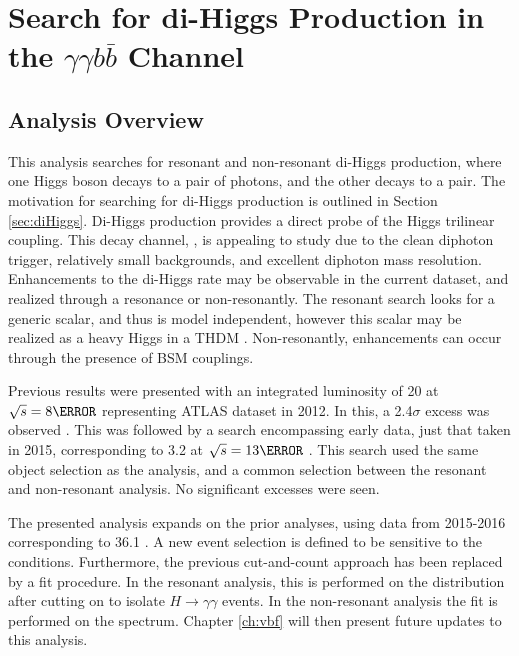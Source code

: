 \chapter{Search for di-Higgs Production in the \texorpdfstring{\lowercase{$\gamma\gamma b\bar{b}$}}{yybb} Channel}
\section{Analysis Overview}

This analysis searches for resonant and non-resonant di-Higgs production, where one Higgs boson decays to a pair of photons, and the other decays to a \bb pair. The motivation for searching for di-Higgs production is outlined in Section \ref{sec:diHiggs}. Di-Higgs production provides a direct probe of the Higgs trilinear coupling. This decay channel, \yybb, is appealing to study due to the clean diphoton trigger, relatively small backgrounds, and excellent diphoton mass resolution. Enhancements to the di-Higgs rate may be observable in the current \RunTwo dataset, and realized through a resonance or non-resonantly. The resonant search looks for a generic scalar, and thus is model independent, however this scalar may be realized as a heavy Higgs in a \gls{THDM} \cite{THDM}. Non-resonantly, enhancements can occur through the presence of \gls{BSM} couplings.


Previous results were presented with an integrated luminosity of 20 \ifb at $\sqrt{s}=\unit{8}{\TeV}$ representing ATLAS dataset in 2012. In this, a 2.4$\sigma$ excess was observed \cite{yybb-2015}. This was followed by a search encompassing early \RunTwo data, just that taken in 2015, corresponding to 3.2 \ifb at $\sqrt{s}=\unit{13}{\TeV}$ \cite{run2_2015}. This search used the same object selection as the \RunOne analysis, and a common selection between the resonant and non-resonant analysis. No significant excesses were seen.

The presented analysis expands on the prior analyses, using \RunTwo data from 2015-2016 corresponding to 36.1 \ifb. A new event selection is defined to be sensitive to the \RunTwo conditions. Furthermore, the previous cut-and-count approach has been replaced by a fit procedure. In the resonant analysis, this is performed on the \myybb distribution after cutting on \myy to isolate $H\rightarrow \gamma \gamma$ events. In the non-resonant analysis the fit is performed on the \myy spectrum. Chapter \ref{ch:vbf} will then present future updates to this analysis.


